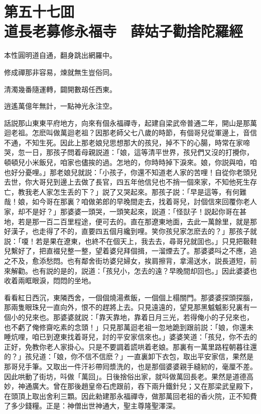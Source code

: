 
\chapter*{第五十七囬　\\道長老募修永福寺　薛姑子勸捨陀羅經}
\thispagestyle{empty}

\begin{myquote}
本性圓明道自通，翻身跳出網羅中。

修成禪那非容易，煉就無生豈俗同。

清濁幾番隨運轉，闢開數刼任西東。

逍遙萬億年無計，一點神光永注空。
\end{myquote}

話説那山東東平府地方，向來有個永福禪寺，起建自梁武帝普通二年，開山是那萬迴老祖。怎麽叫做萬迴老祖？因那老師父七八歲的時節，有個哥兒從軍邊上，音信不通，不知生死。因此上那老娘兒思想那大的孩兒，掉不下的心腸，時常在家啼哭，忽一日，那孩子問着母親説道：「娘，這等清平世界，孩兒們又沒的打攪你，頓頓兒小米飯兒，咱家也儘挨的過。怎地的，你時時掉下淚來。娘，你説與咱，咱也好分憂哩。」那老娘兒就説：「小孩子，你還不知道老人家的苦哩！自從你老頭兒去世，你大哥兒到邊上去做了長官，四五年他信兒也不捎一個來家，不知他死生存亡，教我老人家怎生丢的下？」説了又哭起來。那孩子説：「早是這等，有何難哉！娘，如今哥在那裏？咱做弟郎的早晚間走去，找着哥兒，討個信來回覆你老人家，却不是好？」那婆婆一頭哭，一頭笑起來，説道：「怪獃子！説起你哥在甚地，若是那一百二百里程途，便可去的。直在那遼東地面，去此一萬餘里，就是那好漢子，也走得了不的，直要四五個月纔到哩。笑你孩兒家怎麽去的？」那孩子就説：「嗄！若是果在遼東，也終不在個天上，我去去，尋哥兒就囬也。」只見把靸鞋兒繫好了，把直裰兒整一整，望着婆兒拜個揖，一溜煙去了。那婆婆呌之不應，追之不及，愈添愁悶。也有鄰舍街坊婆兒婦女，挨肩擦背，拿湯送水，説長道短，前來解勸。也有説的是的，説道：「孩兒小，怎去的遠？早晚間却回也。」因此婆婆也收着兩眶眼淚，悶悶的坐地。

看看紅日西沉，東隣西舍，一個個燒湯煮飯，一個個上榻關門。那婆婆探頭探腦，那兩隻眼珠兒一直向外，恨不的趕將上去。只見遠遠的，望見那黑魆魆影兒裏有一個小的兒來也。那婆婆就説：「靠天靠地，靠着日月三光，若得俺小的子兒來也，也不虧了俺修齋吃素的念頭！」只見那萬迴老祖一忽地跪到跟前説：「娘，你還未睡炕哩，咱已到遼東找着哥兒，討的平安家信來也。」婆婆笑道：「孩兒，你不去的正好，免教你老人家掛心。只是不要調着謊哄着老娘。那裏有一萬里路程朝暮往還的？」孩兒道：「娘，你不信不信麽？」一直裏卸下衣包，取出平安家信，果然是那哥兒手筆。又取出一件汗衫帶囘漿洗的，也是那個婆婆親手縫紉的，毫厘不差。因此哄動了街坊，呌做「萬回」。日後捨俗出家，就呌做萬回長老。果然是道德高妙，神通廣大。曾在那後趙皇帝石虎跟前，吞下兩升鐵針兒；又在那梁武皇殿下，在頭頂上取出舍利三顆。因此勑建那永福禪寺，做那萬回老祖的香火院，正不知費了多少錢糧。正是：神僧出世神通大，聖主尊隆聖澤深。

